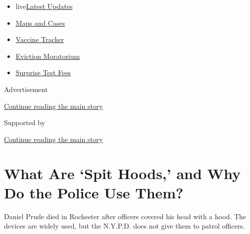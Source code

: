 \begin{itemize}
\tightlist
\item
  live\href{https://www.nytimes3xbfgragh.onion/2020/09/09/world/covid-19-coronavirus.html?name=styln-coronavirus-national\&region=TOP_BANNER\&block=storyline_menu_recirc\&action=click\&pgtype=Article\&impression_id=ee4143a1-f2ad-11ea-a65f-f7b3510e8f53\&variant=undefined}{Latest
  Updates}
\item
  \href{https://www.nytimes3xbfgragh.onion/interactive/2020/us/coronavirus-us-cases.html?name=styln-coronavirus-national\&region=TOP_BANNER\&block=storyline_menu_recirc\&action=click\&pgtype=Article\&impression_id=ee4143a2-f2ad-11ea-a65f-f7b3510e8f53\&variant=undefined}{Maps
  and Cases}
\item
  \href{https://www.nytimes3xbfgragh.onion/interactive/2020/science/coronavirus-vaccine-tracker.html?name=styln-coronavirus-national\&region=TOP_BANNER\&block=storyline_menu_recirc\&action=click\&pgtype=Article\&impression_id=ee4143a3-f2ad-11ea-a65f-f7b3510e8f53\&variant=undefined}{Vaccine
  Tracker}
\item
  \href{https://www.nytimes3xbfgragh.onion/2020/09/02/your-money/eviction-moratorium-covid.html?name=styln-coronavirus-national\&region=TOP_BANNER\&block=storyline_menu_recirc\&action=click\&pgtype=Article\&impression_id=ee4143a4-f2ad-11ea-a65f-f7b3510e8f53\&variant=undefined}{Eviction
  Moratorium}
\item
  \href{https://www.nytimes3xbfgragh.onion/2020/09/09/upshot/coronavirus-surprise-test-fees.html?name=styln-coronavirus-national\&region=TOP_BANNER\&block=storyline_menu_recirc\&action=click\&pgtype=Article\&impression_id=ee416ab0-f2ad-11ea-a65f-f7b3510e8f53\&variant=undefined}{Surprise
  Test Fees}
\end{itemize}

Advertisement

\protect\hyperlink{after-top}{Continue reading the main story}

Supported by

\protect\hyperlink{after-sponsor}{Continue reading the main story}

\hypertarget{what-are-spit-hoods-and-why-do-the-police-use-them}{%
\section{What Are `Spit Hoods,' and Why Do the Police Use
Them?}\label{what-are-spit-hoods-and-why-do-the-police-use-them}}

Daniel Prude died in Rochester after officers covered his head with a
hood. The devices are widely used, but the N.Y.P.D. does not give them
to patrol officers.


